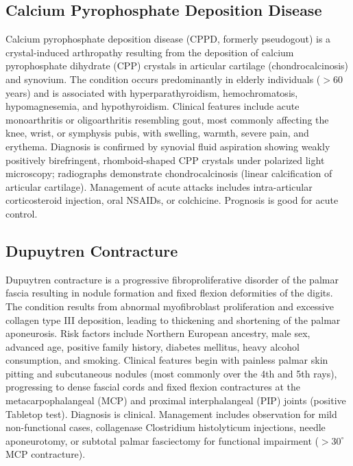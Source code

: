 \subsection{Calcium Pyrophosphate Deposition Disease}
\label{sec:Calcium Pyrophosphate Deposition Disease}
Calcium pyrophosphate deposition disease (CPPD, formerly pseudogout) is a crystal-induced arthropathy resulting from the deposition of calcium pyrophosphate dihydrate (CPP) crystals in articular cartilage (chondrocalcinosis) and synovium. The condition occurs predominantly in elderly individuals ($>60$ years) and is associated with hyperparathyroidism, hemochromatosis, hypomagnesemia, and hypothyroidism. Clinical features include acute monoarthritis or oligoarthritis resembling gout, most commonly affecting the knee, wrist, or symphysis pubis, with swelling, warmth, severe pain, and erythema. Diagnosis is confirmed by synovial fluid aspiration showing weakly positively birefringent, rhomboid-shaped CPP crystals under polarized light microscopy; radiographs demonstrate chondrocalcinosis (linear calcification of articular cartilage). Management of acute attacks includes intra-articular corticosteroid injection, oral NSAIDs, or colchicine. Prognosis is good for acute control.

\subsection{Dupuytren Contracture}
\label{sec:Dupuytren Contracture}
Dupuytren contracture is a progressive fibroproliferative disorder of the palmar fascia resulting in nodule formation and fixed flexion deformities of the digits. The condition results from abnormal myofibroblast proliferation and excessive collagen type III deposition, leading to thickening and shortening of the palmar aponeurosis. Risk factors include Northern European ancestry, male sex, advanced age, positive family history, diabetes mellitus, heavy alcohol consumption, and smoking. Clinical features begin with painless palmar skin pitting and subcutaneous nodules (most commonly over the 4th and 5th rays), progressing to dense fascial cords and fixed flexion contractures at the metacarpophalangeal (MCP) and proximal interphalangeal (PIP) joints (positive Tabletop test). Diagnosis is clinical. Management includes observation for mild non-functional cases, collagenase Clostridium histolyticum injections, needle aponeurotomy, or subtotal palmar fasciectomy for functional impairment ($>30^\circ$ MCP contracture).

